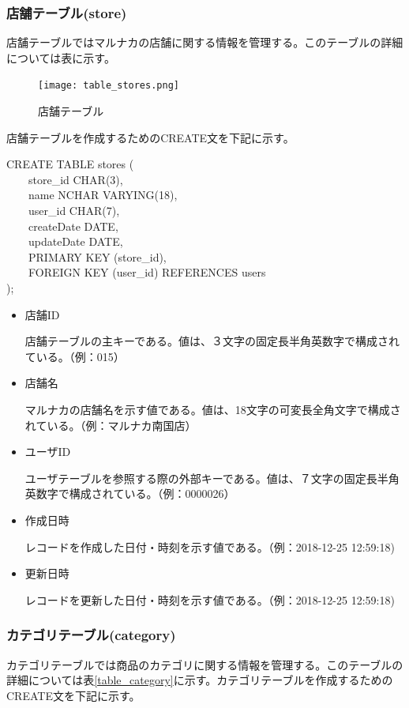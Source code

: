 \documentclass[a4j]{jarticle}
\begin{document}
\subsubsection{店舗テーブル(store)}
店舗テーブルではマルナカの店舗に関する情報を管理する。このテーブルの詳細については表に示す。
\begin{figure}[H]
  \begin{center}
    \texttt{[image: table\_stores.png]} \\
    \caption{店舗テーブル}
    \label{table_store}
  \end{center}
\end{figure}
店舗テーブルを作成するためのCREATE文を下記に示す。
\begin{screen}
  CREATE TABLE stores ( \\
  　　store\_id CHAR(3), \\
  　　name NCHAR VARYING(18), \\
  　　user\_id CHAR(7), \\
  　　createDate DATE, \\
  　　updateDate DATE, \\
  　　PRIMARY KEY (store\_id), \\
  　　FOREIGN KEY (user\_id) REFERENCES users \\
  );
\end{screen}
\begin{itemize}
\item 店舗ID \par
  \indent 店舗テーブルの主キーである。値は、３文字の固定長半角英数字で構成されている。（例：015）
\item 店舗名 \par
  \indent マルナカの店舗名を示す値である。値は、18文字の可変長全角文字で構成されている。（例：マルナカ南国店）
\item ユーザID　\par
  \indent ユーザテーブルを参照する際の外部キーである。値は、７文字の固定長半角英数字で構成されている。（例：0000026）
\item 作成日時 \par
  \indent レコードを作成した日付・時刻を示す値である。（例：2018-12-25 12:59:18)
  \item 更新日時 \par
    \indent レコードを更新した日付・時刻を示す値である。（例：2018-12-25 12:59:18)
\end{itemize}


\subsubsection{カテゴリテーブル(category)}
カテゴリテーブルでは商品のカテゴリに関する情報を管理する。このテーブルの詳細については表\ref{table_category}に示す。カテゴリテーブルを作成するためのCREATE文を下記に示す。
\end{document}
